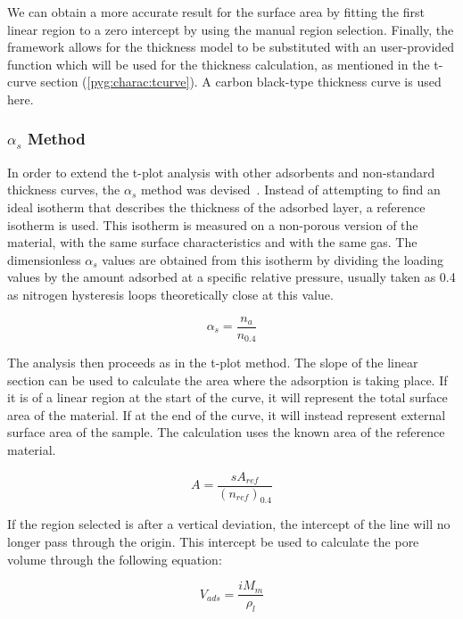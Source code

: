 We can obtain a more accurate result for the surface area by 
fitting the first linear region to a zero intercept by using the 
manual region selection. Finally,
the framework allows for the thickness model to be substituted 
with an user-provided function which will be used for the thickness 
calculation, as mentioned in the t-curve section (\ref{pyg:charac:tcurve}).
A carbon black-type thickness curve is used here.

\subsubsection{\(\alpha_s\) Method}\label{pyg:charac:alphasplot}

In order to extend the t-plot analysis with other adsorbents and non-standard
thickness curves, the \(\alpha_s\) method was 
devised~\cite{atkinsonAdsorptivePropertiesMicroporous1984}.
Instead of attempting to find an ideal isotherm that describes the 
thickness of the adsorbed layer, a reference isotherm is used.
This isotherm is measured on a non-porous version of the material,
with the same surface characteristics and with the same gas.
The dimensionless \(\alpha_s\) values are obtained from this isotherm by 
dividing the loading values by the amount adsorbed at a specific relative
pressure, usually taken as 0.4 as nitrogen hysteresis loops 
theoretically close at this value.

\begin{equation}
	\alpha_s = \frac{n_a}{n_{0.4}}
\end{equation}

The analysis then proceeds as in the t-plot method. 
The slope of the linear section can be used to calculate the area
where the adsorption is taking place. If it is of a linear region
at the start of the curve, it will represent the total surface area
of the material. If at the end of the curve, it will instead
represent external surface area of the sample.
The calculation uses the known area of the reference material.

\begin{equation}
	A = \frac{s A_{ref}}{(n_{ref})_{0.4}}
\end{equation}

If the region selected is after a vertical deviation, the intercept of the line
will no longer pass through the origin. This intercept be used to calculate the
pore volume through the following equation:

\begin{equation}
	V_{ads} = \frac{i M_m}{\rho_{l}}
\end{equation}

